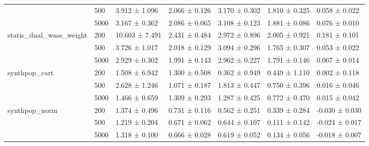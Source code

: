 \begin{tabular}{lllllll}
 & 500 & 3.912 ± 1.096 & 2.066 ± 0.126 & 3.170 ± 0.302 & 1.810 ± 0.325 & 0.058 ± 0.022 \\
 & 5000 & 3.167 ± 0.362 & 2.086 ± 0.065 & 3.108 ± 0.123 & 1.881 ± 0.086 & 0.076 ± 0.010 \\
\cline{1-7}
\multirow[t]{3}{*}{statis_dual_wass_weight} & 200 & 10.603 ± 7.491 & 2.431 ± 0.484 & 2.972 ± 0.896 & 2.005 ± 0.921 & 0.181 ± 0.101 \\
 & 500 & 3.726 ± 1.017 & 2.018 ± 0.129 & 3.094 ± 0.296 & 1.765 ± 0.307 & 0.053 ± 0.022 \\
 & 5000 & 2.929 ± 0.302 & 1.991 ± 0.143 & 2.962 ± 0.227 & 1.791 ± 0.146 & 0.067 ± 0.014 \\
\cline{1-7}
\multirow[t]{3}{*}{synthpop_cart} & 200 & 1.508 ± 6.942 & 1.300 ± 0.508 & 0.362 ± 0.949 & 0.449 ± 1.110 & 0.002 ± 0.118 \\
 & 500 & 2.628 ± 1.246 & 1.071 ± 0.187 & 1.813 ± 0.447 & 0.750 ± 0.396 & 0.016 ± 0.046 \\
 & 5000 & 1.466 ± 0.659 & 1.309 ± 0.293 & 1.287 ± 0.425 & 0.772 ± 0.470 & 0.015 ± 0.042 \\
\cline{1-7}
\multirow[t]{3}{*}{synthpop_norm} & 200 & 1.374 ± 0.496 & 0.731 ± 0.116 & 0.562 ± 0.251 & 0.339 ± 0.284 & -0.030 ± 0.030 \\
 & 500 & 1.219 ± 0.204 & 0.671 ± 0.062 & 0.644 ± 0.107 & 0.111 ± 0.142 & -0.024 ± 0.017 \\
 & 5000 & 1.318 ± 0.100 & 0.666 ± 0.028 & 0.619 ± 0.052 & 0.134 ± 0.056 & -0.018 ± 0.007 \\
\cline{1-7}
\bottomrule
\end{tabular}
